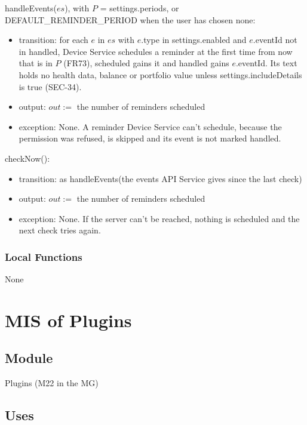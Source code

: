 \documentclass[12pt, titlepage]{article}
\begin{document}
\noindent handleEvents($es$), with $P$ = settings.periods, or
DEFAULT\_REMINDER\_PERIOD when the user has chosen none:
\begin{itemize}
\item transition: for each $e$ in $es$ with $e$.type in settings.enabled and
  $e$.eventId not in handled, Device Service schedules a reminder at the
  first time from now that is in $P$ (FR73), scheduled gains it and handled
  gains $e$.eventId. Its text holds no health data, balance or portfolio value
  unless settings.includeDetails is true (SEC-34).
\item output: $out :=$ the number of reminders scheduled
\item exception: None. A reminder Device Service can't schedule, because the
  permission was refused, is skipped and its event is not marked handled.
\end{itemize}

\noindent checkNow():
\begin{itemize}
\item transition: as handleEvents(the events API Service gives since the last
  check)
\item output: $out :=$ the number of reminders scheduled
\item exception: None. If the server can't be reached, nothing is scheduled
  and the next check tries again.
\end{itemize}

\subsubsection{Local Functions}

None

\par\endgroup

\newpage

\section{MIS of Plugins} \label{MisPlugins}

\subsection{Module}

Plugins (M22 in the MG)

\subsection{Uses}
\end{document}
